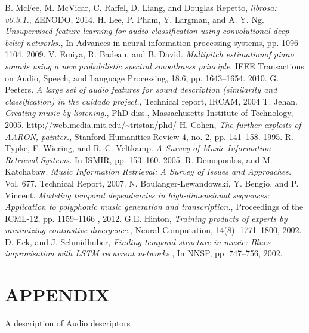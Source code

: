 \documentclass[letterpaper, 10 pt, conference]{ieeeconf}
\begin{document}
\begin{thebibliography}{99}
 B. McFee, M. McVicar, C. Raffel, D. Liang, and Douglas Repetto, \textit{librosa: v0.3.1.}, ZENODO, 2014.
 H. Lee, P. Pham, Y. Largman, and A. Y. Ng. \textit{Unsupervised feature learning for audio classification using convolutional deep belief networks.}, In Advances in neural information processing systems, pp. 1096--1104. 2009.
 V. Emiya, R. Badeau, and B. David. \textit{Multipitch estimationof piano sounds using a new probabilistic spectral smoothness principle}, IEEE Transactions on Audio, Speech, and Language Processing, 18.6, pp. 1643--1654. 2010.
 G. Peeters. \textit{A large set of audio features for sound description (similarity and classification) in the cuidado project.}, Technical report, IRCAM, 2004
 T. Jehan. \textit{Creating music by listening.}, PhD diss., Massachusetts Institute of Technology, 2005. \url{http://web.media.mit.edu/~tristan/phd/}
 H. Cohen, \textit{The further exploits of AARON, painter.}, Stanford Humanities Review 4, no. 2, pp. 141--158. 1995.
 R. Typke, F. Wiering, and R. C. Veltkamp. \textit{A Survey of Music Information Retrieval Systems.} In ISMIR, pp. 153--160. 2005.
 R. Demopoulos, and M. Katchabaw. \textit{Music Information Retrieval: A Survey of Issues and Approaches.} Vol. 677. Technical Report, 2007.
  N. Boulanger-Lewandowski, Y. Bengio, and P. Vincent. \textit{Modeling temporal dependencies in high-dimensional sequences: Application to polyphonic music generation and transcription.}, Proceedings of the ICML-12, pp. 1159--1166 , 2012.
 G.E. Hinton, \textit{Training products of experts by minimizing contrastive divergence.}, Neural Computation, 14(8): 1771--1800, 2002.
 D. Eck, and J. Schmidhuber, \textit{Finding temporal structure in music: Blues improvisation with LSTM recurrent networks.}, In NNSP, pp. 747--756, 2002.
\end{thebibliography}

\pagebreak
\section*{APPENDIX}
A description of Audio descriptors
\end{document}
